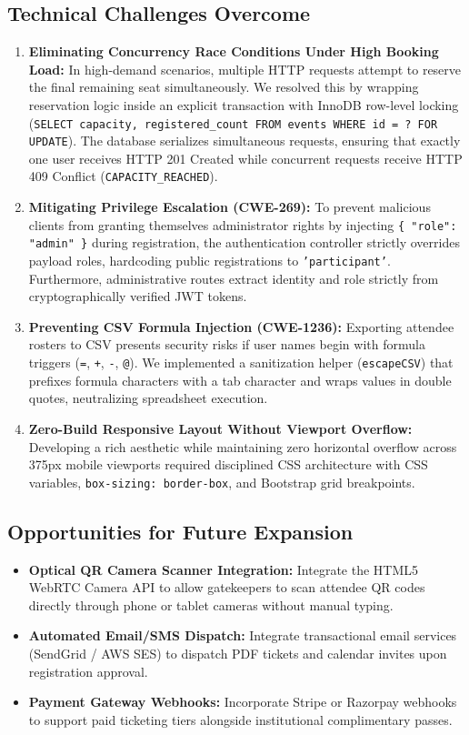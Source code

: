 \documentclass[11pt,a4paper]{article}
\begin{document}
\subsection*{Technical Challenges Overcome}
\begin{enumerate}[leftmargin=*]
    \item \textbf{Eliminating Concurrency Race Conditions Under High Booking Load:} In high-demand scenarios, multiple HTTP requests attempt to reserve the final remaining seat simultaneously. We resolved this by wrapping reservation logic inside an explicit transaction with InnoDB row-level locking (\texttt{SELECT capacity, registered\_count FROM events WHERE id = ? FOR UPDATE}). The database serializes simultaneous requests, ensuring that exactly one user receives HTTP 201 Created while concurrent requests receive HTTP 409 Conflict (\texttt{CAPACITY\_REACHED}).
    \item \textbf{Mitigating Privilege Escalation (CWE-269):} To prevent malicious clients from granting themselves administrator rights by injecting \texttt{\{ "role": "admin" \}} during registration, the authentication controller strictly overrides payload roles, hardcoding public registrations to \texttt{'participant'}. Furthermore, administrative routes extract identity and role strictly from cryptographically verified JWT tokens.
    \item \textbf{Preventing CSV Formula Injection (CWE-1236):} Exporting attendee rosters to CSV presents security risks if user names begin with formula triggers (\texttt{=}, \texttt{+}, \texttt{-}, \texttt{@}). We implemented a sanitization helper (\texttt{escapeCSV}) that prefixes formula characters with a tab character and wraps values in double quotes, neutralizing spreadsheet execution.
    \item \textbf{Zero-Build Responsive Layout Without Viewport Overflow:} Developing a rich aesthetic while maintaining zero horizontal overflow across 375px mobile viewports required disciplined CSS architecture with CSS variables, \texttt{box-sizing: border-box}, and Bootstrap grid breakpoints.
\end{enumerate}

\subsection*{Opportunities for Future Expansion}
\begin{itemize}[leftmargin=*]
    \item \textbf{Optical QR Camera Scanner Integration:} Integrate the HTML5 WebRTC Camera API to allow gatekeepers to scan attendee QR codes directly through phone or tablet cameras without manual typing.
    \item \textbf{Automated Email/SMS Dispatch:} Integrate transactional email services (SendGrid / AWS SES) to dispatch PDF tickets and calendar invites upon registration approval.
    \item \textbf{Payment Gateway Webhooks:} Incorporate Stripe or Razorpay webhooks to support paid ticketing tiers alongside institutional complimentary passes.
\end{itemize}
\end{document}
